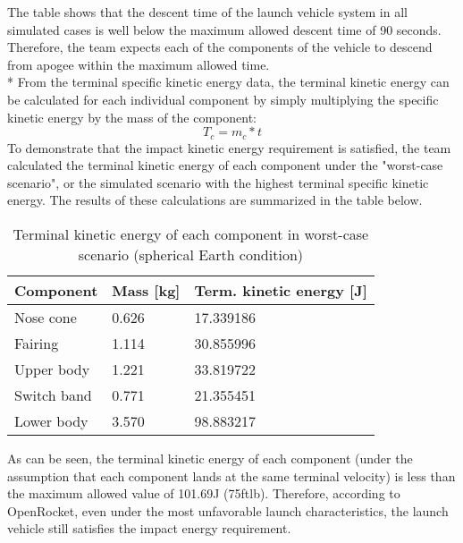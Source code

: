 The table shows that the descent time of the launch vehicle system in all simulated cases is well below the maximum allowed descent time of 90 seconds. Therefore, the team expects each of the components of the vehicle to descend from apogee within the maximum allowed time.
\\*
\newline
From the terminal specific kinetic energy data, the terminal kinetic energy can be calculated for each individual component by simply multiplying the specific kinetic energy by the mass of the component:
 \begin{equation}
    T{_c} = m{_c}*t    
 \end{equation}
To demonstrate that the impact kinetic energy requirement is satisfied, the team calculated the terminal kinetic energy of each component under the "worst-case scenario", or the simulated scenario with the highest terminal specific kinetic energy.  The results of these calculations are summarized in the table below.

\begin{table}[H]
\centering
\caption{Terminal kinetic energy of each component in worst-case scenario (spherical Earth condition)}
\label{tab:FlightDynamics:TerminalKineticEnergy}
\begin{tabularx}{.5\linewidth}{XlX}
\toprule
  \textbf{Component} & \textbf{Mass [kg]} &  \textbf{Term. kinetic energy [J]} \\
\midrule
Nose cone & 0.626 &             17.339186 \\
Fairing & 1.114 &             30.855996 \\
Upper body & 1.221 &             33.819722 \\
Switch band & 0.771 &             21.355451 \\
Lower body & 3.570 &             98.883217 \\
\bottomrule
\end{tabularx}
\end{table}

As can be seen, the terminal kinetic energy of each component (under the assumption that each component lands at the same terminal velocity) is less than the maximum allowed value of 101.69J (75ftlb). Therefore, according to OpenRocket, even under the most unfavorable launch characteristics, the launch vehicle still satisfies the impact energy requirement.


